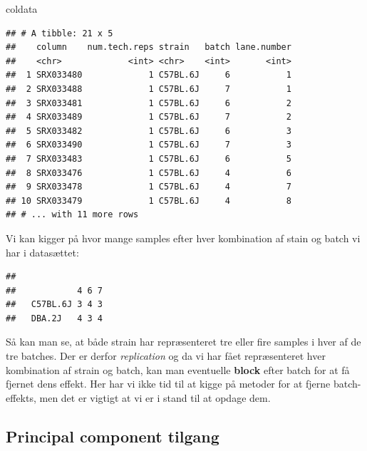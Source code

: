 \documentclass[
]{book}
\newenvironment{Shaded}{\begin{snugshade}}{\end{snugshade}}
\newcommand{\FunctionTok}[1]{\textcolor[rgb]{0.00,0.00,0.00}{#1}}
\newcommand{\NormalTok}[1]{#1}
\newcommand{\SpecialCharTok}[1]{\textcolor[rgb]{0.00,0.00,0.00}{#1}}
\begin{document}
\begin{Shaded}
\begin{Highlighting}[]
\NormalTok{coldata}
\end{Highlighting}
\end{Shaded}

\begin{verbatim}
## # A tibble: 21 x 5
##    column    num.tech.reps strain   batch lane.number
##    <chr>             <int> <chr>    <int>       <int>
##  1 SRX033480             1 C57BL.6J     6           1
##  2 SRX033488             1 C57BL.6J     7           1
##  3 SRX033481             1 C57BL.6J     6           2
##  4 SRX033489             1 C57BL.6J     7           2
##  5 SRX033482             1 C57BL.6J     6           3
##  6 SRX033490             1 C57BL.6J     7           3
##  7 SRX033483             1 C57BL.6J     6           5
##  8 SRX033476             1 C57BL.6J     4           6
##  9 SRX033478             1 C57BL.6J     4           7
## 10 SRX033479             1 C57BL.6J     4           8
## # ... with 11 more rows
\end{verbatim}

Vi kan kigger på hvor mange samples efter hver kombination af stain og batch vi har i datasættet:

\begin{Shaded}
\end{Shaded}

\begin{verbatim}
##           
##            4 6 7
##   C57BL.6J 3 4 3
##   DBA.2J   4 3 4
\end{verbatim}

Så kan man se, at både strain har repræsenteret tre eller fire samples i hver af de tre batches. Der er derfor \emph{replication} og da vi har fået repræsenteret hver kombination af strain og batch, kan man eventuelle \textbf{block} efter batch for at få fjernet dens effekt. Her har vi ikke tid til at kigge på metoder for at fjerne batch-effekts, men det er vigtigt at vi er i stand til at opdage dem.

\hypertarget{principal-component-tilgang}{%
\subsection{Principal component tilgang}\label{principal-component-tilgang}}
\end{document}
